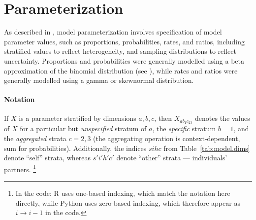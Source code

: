 \section{Parameterization}\label{model.par}
As described in , model parameterization involves
specification of model parameter values, such as proportions, probabilities, rates, and ratios,
including stratified values to reflect heterogeneity,
and sampling distributions to reflect uncertainty.
Proportions and probabilities were generally modelled using
a beta approximation of the binomial distribution (see ),
while rates and ratios were generally modelled using a gamma or skewnormal distribution.
\paragraph{Notation}
If $X$ is a parameter stratified by dimensions $a,b,c$,
then $X_{ab_{1}c_{23}}$ denotes the values of $X$ for
a particular but \emph{unspecified} stratum of $a$,
the \emph{specific} stratum $b = 1$,
and the \emph{aggregated} strata $c = 2,3$
(the aggregating operation is context-dependent, \eg sum for probabilities).
Additionally, the indices $sihc$ from Table~\ref{tab:model.dims} denote ``self'' strata,
whereas $s'i'h'c'$ denote ``other'' strata --- \ie individuals' partners.%
\footnote{In the code: R uses one-based indexing, which match the notation here directly,
  while Python uses zero-based indexing, which therefore appear as $i \rightarrow i-1$ in the code.}



